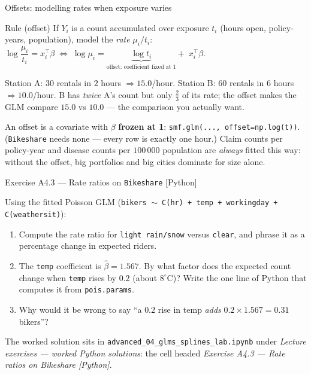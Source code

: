 \documentclass[aspectratio=169,11pt]{beamer}
\begin{document}
\begin{frame}{Offsets: modelling rates when exposure varies}
  \scriptsize
  \begin{block}{Rule (offset)}
    \scriptsize
    If $Y_i$ is a count accumulated over exposure $t_i$ (hours open, policy-years,
    population), model the \emph{rate} $\mu_i/t_i$:
    \quad $\log\dfrac{\mu_i}{t_i} = x_i^{\top}\beta
      \;\Longleftrightarrow\;
      \log\mu_i = \underbrace{\log t_i}_{\text{offset: coefficient fixed at }1} +\; x_i^{\top}\beta$.
  \end{block}
  \begin{numexample}
    Station A: $30$ rentals in $2$ hours $\Rightarrow 15.0$/hour. Station B: $60$
    rentals in $6$ hours $\Rightarrow 10.0$/hour. B has \emph{twice} A's count but
    only $\tfrac{2}{3}$ of its rate; the offset makes the GLM compare $15.0$ vs
    $10.0$ --- the comparison you actually want.
  \end{numexample}
  \begin{takeaway}
    An offset is a covariate with $\beta$ \textbf{frozen at 1}:
    \texttt{smf.glm(..., offset=np.log(t))}. (\texttt{Bikeshare} needs none ---
    every row is exactly one hour.) Claim counts per policy-year and disease counts per
    $100\,000$ population are \emph{always} fitted this way: without the offset, big
    portfolios and big cities dominate for size alone.
  \end{takeaway}
\end{frame}

\begin{frame}{Exercise A4.3 --- Rate ratios on \texttt{Bikeshare} [Python]}
\begin{exercise}
  Using the fitted Poisson GLM
  (\texttt{bikers $\sim$ C(hr) + temp + workingday + C(weathersit)}):
  \begin{enumerate}
    \item Compute the rate ratio for \texttt{light rain/snow} versus \texttt{clear},
          and phrase it as a percentage change in expected riders.
    \item The \texttt{temp} coefficient is $\hat\beta = 1.567$. By what factor does the
          expected count change when \texttt{temp} rises by $0.2$ (about
          $8^{\circ}$C)? Write the one line of Python that computes it from
          \texttt{pois.params}.
    \item Why would it be wrong to say ``a $0.2$ rise in temp \emph{adds}
          $0.2\times 1.567 = 0.31$ bikers''?
  \end{enumerate}
\end{exercise}
\begin{labnote}
  The worked solution sits in \texttt{advanced\_04\_glms\_splines\_lab.ipynb} under
  \emph{Lecture exercises --- worked Python solutions}: the cell headed
  \emph{Exercise A4.3 --- Rate ratios on Bikeshare [Python]}.
\end{labnote}
\end{frame}
\end{document}
